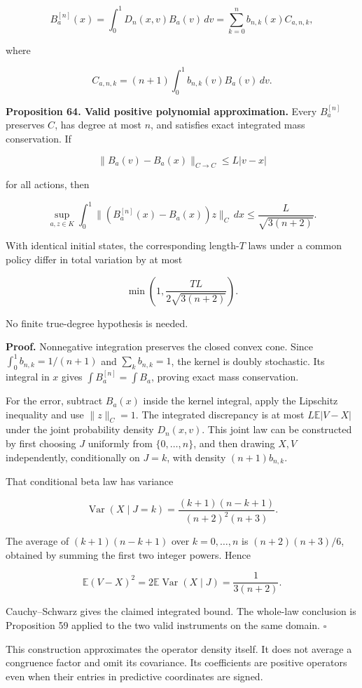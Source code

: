 \documentclass[11pt,letterpaper]{article}
\begin{document}
\[
B_a^{[n]}(x)=\int_0^1D_n(x,v)B_a(v)\,dv
=\sum_{k=0}^n b_{n,k}(x)C_{a,n,k},
\]

where

\[
C_{a,n,k}=(n+1)\int_0^1b_{n,k}(v)B_a(v)\,dv.
\]

\textbf{Proposition 64. Valid positive polynomial approximation.} Every
\(B_a^{[n]}\) preserves \(C\), has degree at most \(n\), and satisfies
exact integrated mass conservation. If

\[
\|B_a(v)-B_a(x)\|_{C\to C}\leq L|v-x|
\]

for all actions, then

\[
\boxed{
\sup_{a,z\in K}\int_0^1
\|(B_a^{[n]}(x)-B_a(x))z\|_C\,dx
\leq\frac{L}{\sqrt{3(n+2)}}.
}
\]

With identical initial states, the corresponding length-\(T\) laws under
a common policy differ in total variation by at most

\[
\boxed{\min\left(1,\frac{TL}{2\sqrt{3(n+2)}}\right).}
\]

No finite true-degree hypothesis is needed.

\textbf{Proof.} Nonnegative integration preserves the closed convex
cone. Since \(\int_0^1b_{n,k}=1/(n+1)\) and \(\sum_k b_{n,k}=1\), the
kernel is doubly stochastic. Its integral in \(x\) gives
\(\int B_a^{[n]}=\int B_a\), proving exact mass conservation.

For the error, subtract \(B_a(x)\) inside the kernel integral, apply the
Lipschitz inequality and use \(\|z\|_C=1\). The integrated discrepancy
is at most \(L\mathbb E|V-X|\) under the joint probability density
\(D_n(x,v)\). This joint law can be constructed by first choosing \(J\)
uniformly from \(\{0,\ldots,n\}\), and then drawing \(X,V\)
independently, conditionally on \(J=k\), with density \((n+1)b_{n,k}\).

That conditional beta law has variance

\[
\operatorname{Var}(X\mid J=k)
=\frac{(k+1)(n-k+1)}{(n+2)^2(n+3)}.
\]

The average of \((k+1)(n-k+1)\) over \(k=0,\ldots,n\) is
\((n+2)(n+3)/6\), obtained by summing the first two integer powers.
Hence

\[
\mathbb E(V-X)^2
=2\mathbb E\operatorname{Var}(X\mid J)
=\frac1{3(n+2)}.
\]

Cauchy--Schwarz gives the claimed integrated bound. The whole-law
conclusion is Proposition 59 applied to the two valid instruments on the
same domain. \(\square\)

This construction approximates the operator density itself. It does not
average a congruence factor and omit its covariance. Its coefficients
are positive operators even when their entries in predictive coordinates
are signed.
\end{document}
